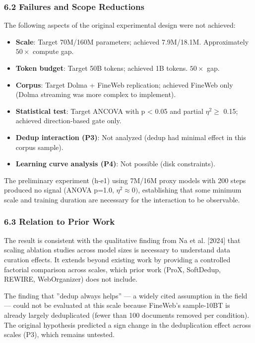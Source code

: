 \subsubsection{6.2 Failures and Scope Reductions}

The following aspects of the original experimental design were not achieved:

\begin{itemize}
\item \textbf{Scale}: Target 70M/160M parameters; achieved 7.9M/18.1M. Approximately $50\times$ compute gap.
\item \textbf{Token budget}: Target 50B tokens; achieved 1B tokens. $50\times$ gap.
\item \textbf{Corpus}: Target Dolma + FineWeb replication; achieved FineWeb only (Dolma streaming was more complex to implement).
\item \textbf{Statistical test}: Target ANCOVA with p < 0.05 and partial $\eta^2 \geq$ 0.15; achieved direction-based gate only.
\item \textbf{Dedup interaction (P3)}: Not analyzed (dedup had minimal effect in this corpus sample).
\item \textbf{Learning curve analysis (P4)}: Not possible (disk constraints).
\end{itemize}

The preliminary experiment (h-e1) using 7M/16M proxy models with 200 steps produced no signal (ANOVA p=1.0, $\eta^{2}\approx 0)$, establishing that some minimum scale and training duration are necessary for the interaction to be observable.

\subsubsection{6.3 Relation to Prior Work}

The result is consistent with the qualitative finding from Na et al. [2024] that scaling ablation studies across model sizes is necessary to understand data curation effects. It extends beyond existing work by providing a controlled factorial comparison across scales, which prior work (ProX, SoftDedup, REWIRE, WebOrganizer) does not include.

The finding that ''dedup always helps'' --- a widely cited assumption in the field --- could not be evaluated at this scale because FineWeb's sample-10BT is already largely deduplicated (fewer than 100 documents removed per condition). The original hypothesis predicted a sign change in the deduplication effect across scales (P3), which remains untested.

